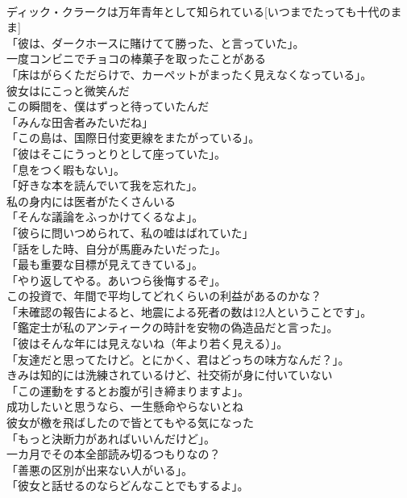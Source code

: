 \documentclass[8pt]{extreport}
\begin{document}
\begin{CJK}{UTF8}{min}
\\	ディック・クラークは万年青年として知られている[いつまでたっても十代のまま]	
\\	「彼は、ダークホースに賭けてて勝った、と言っていた」。	
\\	一度コンビニでチョコの棒菓子を取ったことがある	
\\	「床はがらくただらけで、カーペットがまったく見えなくなっている」。	
\\	彼女はにこっと微笑んだ	
\\	この瞬間を、僕はずっと待っていたんだ	
\\	「みんな田舎者みたいだね」	
\\	「この島は、国際日付変更線をまたがっている」。	
\\	「彼はそこにうっとりとして座っていた」。	
\\	「息をつく暇もない」。	
\\	「好きな本を読んでいて我を忘れた」。	
\\	私の身内には医者がたくさんいる	
\\	「そんな議論をふっかけてくるなよ」。	
\\	「彼らに問いつめられて、私の嘘はばれていた」	
\\	「話をした時、自分が馬鹿みたいだった」。	
\\	「最も重要な目標が見えてきている」。	
\\	「やり返してやる。あいつら後悔するぞ」。	
\\	この投資で、年間で平均してどれくらいの利益があるのかな？	
\\	「未確認の報告によると、地震による死者の数は12人ということです」。	
\\	「鑑定士が私のアンティークの時計を安物の偽造品だと言った」。	
\\	「彼はそんな年には見えないね（年より若く見える）」。	
\\	「友達だと思ってたけど。とにかく、君はどっちの味方なんだ？」。	
\\	きみは知的には洗練されているけど、社交術が身に付いていない	
\\	「この運動をするとお腹が引き締まりますよ」。	
\\	成功したいと思うなら、一生懸命やらないとね	
\\	彼女が檄を飛ばしたので皆とてもやる気になった	
\\	「もっと決断力があればいいんだけど」。	
\\	一カ月でその本全部読み切るつもりなの？	
\\	「善悪の区別が出来ない人がいる」。	
\\	「彼女と話せるのならどんなことでもするよ」。	

\end{CJK}
\end{document}
